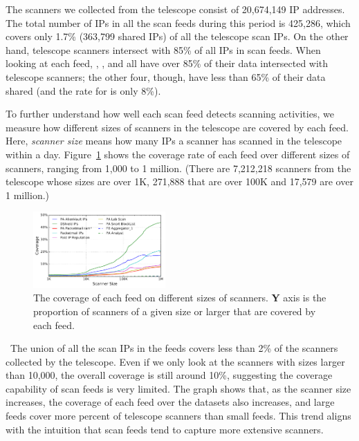 The scanners we collected from the telescope consist of 20,674,149 IP addresses.
The total number of IPs in all the scan feeds during this period is
425,286, which covers only 1.7\% (363,799 shared IPs) of all the telescope scan IPs.
On the other hand, telescope scanners intersect with 85\% of all IPs in scan feeds.
When looking at each feed, {\feedTSAlienVault}, {\feeddshield}
{\feedpacketmail}, {\feedTSLabScan} and {\feedTSramnode} all have over 85\% of their
data intersected with telescope scanners; the other four, though, have less than 65\%
of their data shared (and the rate for {\feedTSSnort} is only 8\%).


To further understand how well each scan feed detects scanning
activities, we measure how different sizes of scanners in the
telescope are covered by each feed. Here, \emph{scanner size} means how
many IPs a scanner has scanned in the telescope within a
day. Figure~\ref{fig:caida_coverage_cdf} shows the coverage rate of
each feed over different sizes of scanners, ranging from 1,000 to
1 million. (There are 7,212,218 scanners from the telescope whose sizes
are over 1K, 271,888 that are over 100K and 17,579 are over 1 million.)


\begin{figure}
\centering
\includegraphics[width=0.45\textwidth]{images/caida_coverage_cdf.pdf}
\caption{The coverage of each feed on different sizes of scanners.
\textbf{Y} axis is the proportion of scanners of a given size or larger that are
covered by each feed.}
\label{fig:caida_coverage_cdf}
\end{figure}

\finding\
The union of all the scan IPs in the feeds covers less than
2\% of the scanners collected by the telescope. Even if we only look
at the scanners with sizes larger than 10,000, the overall coverage is still
around 10\%, suggesting the coverage capability of scan feeds
is very limited. The graph shows that, as the scanner size increases, the coverage of
each feed over the datasets also increases, and large feeds cover more percent
of telescope scanners than small feeds. This trend aligns with the intuition that
scan feeds tend to capture more extensive scanners.

